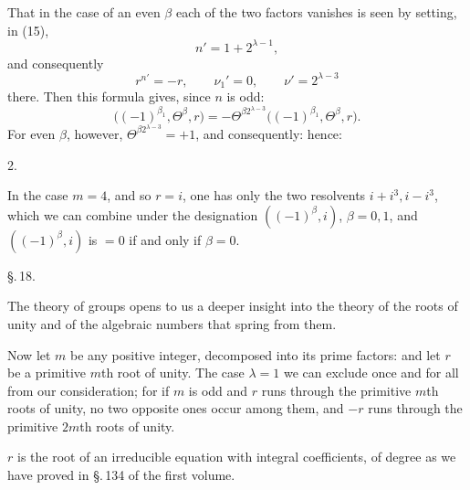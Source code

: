 That in the case of an even $\beta$ each of the two factors vanishes is seen by setting, in (15),
\[
n' = 1 + 2^{\lambda-1},
\]
and consequently
\[
r^{n'} = -r, \qquad \nu_1' = 0, \qquad \nu' = 2^{\lambda-3}
\]
there. Then this formula gives, since $n$ is odd:
\[
\bigl((-1)^{\beta_1}, \Theta^\beta, r\bigr) = -\Theta^{\beta 2^{\lambda-3}} \bigl((-1)^{\beta_1}, \Theta^\beta, r\bigr).
\]
For even $\beta$, however, $\Theta^{\beta 2^{\lambda-3}} = +1$, and consequently:
hence:

2.~

In the case $m=4$, and so $r=i$, one has only the two resolvents $i+i^3, i-i^3$, which we can combine under the designation $((-1)^\beta, i)$, $\beta=0,1$, and $((-1)^\beta, i)$ is $=0$ if and only if $\beta=0$.

\begin{center}
\S.\,18.\\
\end{center}

The theory of  groups opens to us a deeper insight into the theory of the roots of unity and of the algebraic numbers that spring from them.

Now let $m$ be any positive integer, decomposed into its prime factors:
and let $r$ be a primitive $m$th root of unity. The case $\lambda=1$ we can exclude once and for all from our consideration; for if $m$ is odd and $r$ runs through the primitive $m$th roots of unity, no two opposite ones occur among them, and $-r$ runs through the primitive $2m$th roots of unity.

$r$ is the root of an irreducible  equation with integral coefficients, of degree
as we have proved in \S.\,134 of the first volume.
